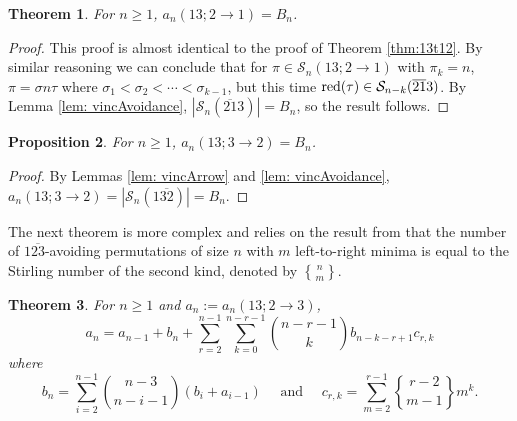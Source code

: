 \documentclass[11pt]{article}
\newcommand{\ol}[1]{\overline{#1}}
\renewcommand\S{\mathcal S}
\newtheorem{theorem}{Theorem}[section]
\newtheorem{proposition}[theorem]{Proposition}
\theoremstyle{definition}
\newcommand{\stirling}[2]{\genfrac{\{}{\}}{0pt}{}{#1}{#2}}
\begin{document}
\begin{theorem} \label{thm:13t21}
    For $n \geq 1$, $a_n(13; 2 \to 1) = B_n$.
\end{theorem}

\begin{proof}
    This proof is almost identical to the proof of Theorem \ref{thm:13t12}. By similar reasoning we can conclude that for $\pi \in \S_n(13; 2 \to 1)$ with $\pi_k = n$, $\pi = \sigma n \tau$ where $\sigma_1 < \sigma_2 < \cdots < \sigma_{k-1}$, but this time ${\rm red}(\tau) \in \S_{n-k}(\ol{21}3)$. By Lemma \ref{lem: vincAvoidance}, $|\S_n(\ol{21}3)| = B_n$, so the result follows.
\end{proof}

\begin{proposition} \label{prop:13t32}
    For $n \geq 1$, $a_n(13; 3 \to 2) = B_n$.
\end{proposition}

\begin{proof}
    By Lemmas \ref{lem: vincArrow} and \ref{lem: vincAvoidance}, $a_n(13; 3 \to 2) = |\S_n(1\ol{32})| = B_n$.
\end{proof}

The next theorem is more complex and relies on the result from \cite[Porism 1]{Cl01} that the number of $1\overline{23}$-avoiding permutations of size $n$ with $m$ left-to-right minima is equal to the Stirling number of the second kind, denoted by $\stirling{n}{m}.$



\begin{theorem} \label{thm:13t23}
    For $n \geq 1$ and $a_n:=a_n(13;2 \to 3)$, \[a_n= a_{n-1}+b_n + \sum_{r=2}^{n-1}\sum_{k=0}^{n-r-1}\binom{n-r-1}{k}b_{n-k-r+1}c_{r,k} \]
    where \[b_n=\sum_{i=2}^{n-1}\binom{n-3}{n-i-1}(b_{i}+a_{i-1}) \quad \text{ and } \quad
c_{r,k}=\sum_{m=2}^{r-1} \stirling{r-2}{m-1}m^k.
\]
\end{theorem}
\end{document}
